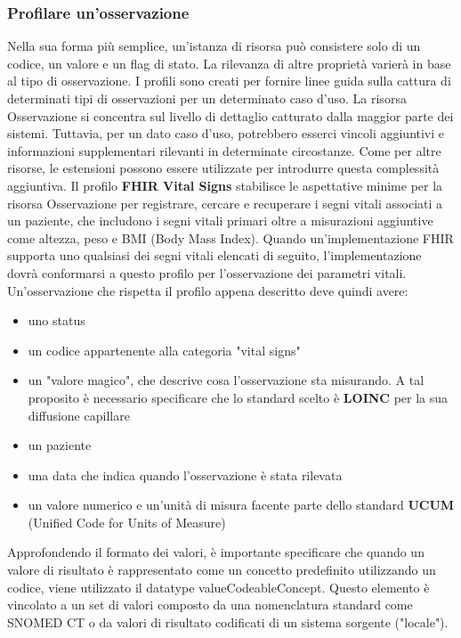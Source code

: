 \documentclass[a4paper]{article}
\begin{document}
\subsubsection*{Profilare un'osservazione}
Nella sua forma più semplice, un'istanza di risorsa può consistere solo di un codice, un valore e un flag di stato.
La rilevanza di altre proprietà varierà in base al tipo di osservazione.
I profili sono creati per fornire linee guida sulla cattura di determinati tipi di osservazioni per un determinato caso d'uso.
La risorsa Osservazione si concentra sul livello di dettaglio catturato dalla maggior parte dei sistemi.
Tuttavia, per un dato caso d'uso, potrebbero esserci vincoli aggiuntivi e informazioni supplementari rilevanti in determinate circostanze.
Come per altre risorse, le estensioni possono essere utilizzate per introdurre questa complessità aggiuntiva.
Il profilo \textbf{FHIR Vital Signs} stabilisce le aspettative minime per la risorsa Osservazione per registrare, cercare e recuperare i segni vitali associati a un paziente, che includono i segni vitali primari oltre a misurazioni aggiuntive come altezza, peso e BMI (Body Mass Index).
Quando un'implementazione FHIR supporta uno qualsiasi dei segni vitali elencati di seguito, l'implementazione dovrà conformarsi a questo profilo per l'osservazione dei parametri vitali.
Un'osservazione che rispetta il profilo appena descritto deve quindi avere:
\begin{itemize}
    \item uno status
    \item un codice appartenente alla categoria "vital signs"
    \item un "valore magico", che descrive cosa l'osservazione sta misurando.
          A tal proposito è necessario specificare che lo standard scelto è \textbf{LOINC} per la sua diffusione capillare
    \item un paziente
    \item una data che indica quando l'osservazione è stata rilevata
    \item un valore numerico e un'unità di misura facente parte dello standard \textbf{UCUM} (Unified Code for Units of Measure)
\end{itemize}
Approfondendo il formato dei valori, è importante specificare che quando un valore di risultato è rappresentato come un concetto predefinito utilizzando un codice, viene utilizzato il datatype valueCodeableConcept.
Questo elemento è vincolato a un set di valori composto da una nomenclatura standard come SNOMED CT o da valori di risultato codificati di un sistema sorgente ("locale").
\end{document}
